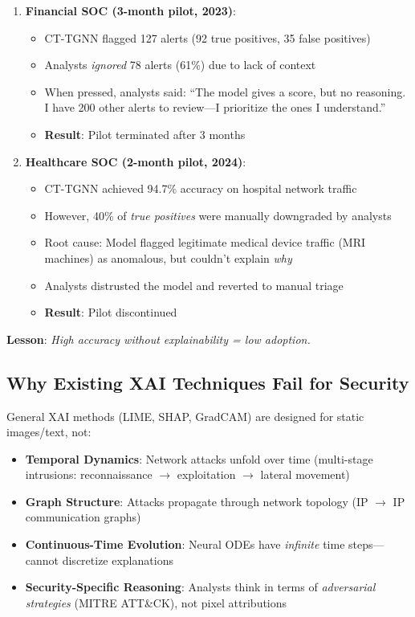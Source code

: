 \documentclass[11pt]{article}
\begin{document}
\begin{enumerate}
    \item \textbf{Financial SOC (3-month pilot, 2023)}:
    \begin{itemize}
        \item CT-TGNN flagged 127 alerts (92 true positives, 35 false positives)
        \item Analysts \textit{ignored} 78 alerts (61\%) due to lack of context
        \item When pressed, analysts said: ``The model gives a score, but no reasoning. I have 200 other alerts to review—I prioritize the ones I understand.''
        \item \textbf{Result}: Pilot terminated after 3 months
    \end{itemize}

    \item \textbf{Healthcare SOC (2-month pilot, 2024)}:
    \begin{itemize}
        \item CT-TGNN achieved 94.7\% accuracy on hospital network traffic
        \item However, 40\% of \textit{true positives} were manually downgraded by analysts
        \item Root cause: Model flagged legitimate medical device traffic (MRI machines) as anomalous, but couldn't explain \textit{why}
        \item Analysts distrusted the model and reverted to manual triage
        \item \textbf{Result}: Pilot discontinued
    \end{itemize}
\end{enumerate}

\textbf{Lesson}: \textit{High accuracy without explainability = low adoption.}

\subsection{Why Existing XAI Techniques Fail for Security}

General XAI methods (LIME, SHAP, GradCAM) are designed for static images/text, not:

\begin{itemize}
    \item \textbf{Temporal Dynamics}: Network attacks unfold over time (multi-stage intrusions: reconnaissance $\rightarrow$ exploitation $\rightarrow$ lateral movement)
    \item \textbf{Graph Structure}: Attacks propagate through network topology (IP $\rightarrow$ IP communication graphs)
    \item \textbf{Continuous-Time Evolution}: Neural ODEs have \textit{infinite} time steps—cannot discretize explanations
    \item \textbf{Security-Specific Reasoning}: Analysts think in terms of \textit{adversarial strategies} (MITRE ATT\&CK), not pixel attributions
\end{itemize}
\end{document}
